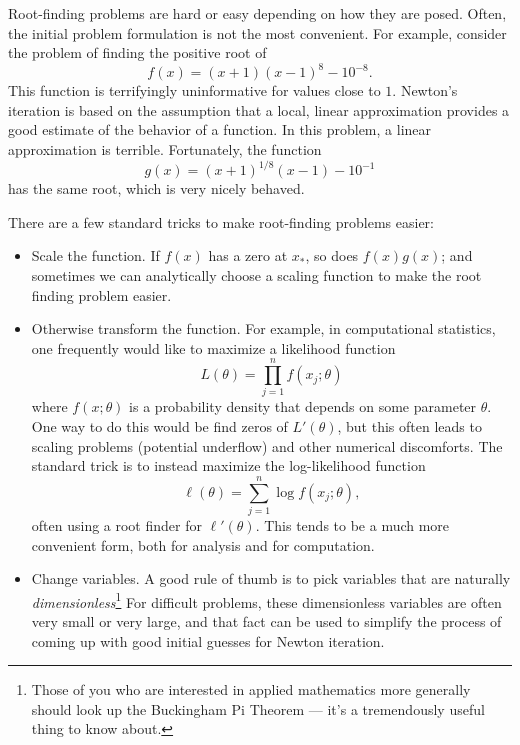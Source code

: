 \documentclass[12pt, leqno]{article} %
\begin{document}



Root-finding problems are hard or easy depending on how they are
posed.  Often, the initial problem formulation is not the most
convenient.  For example, consider the problem of finding the
positive root of
\[
  f(x) = (x+1)(x-1)^8-10^{-8}.
\]
This function is terrifyingly uninformative for values close to $1$.
Newton's iteration is based on the assumption that a local, linear
approximation provides a good estimate of the behavior of a function.
In this problem, a linear approximation is terrible.  Fortunately,
the function
\[
  g(x) = (x+1)^{1/8} (x-1)-10^{-1}
\]
has the same root, which is very nicely behaved.

There are a few standard tricks to make root-finding problems easier:
\begin{itemize}
\item
  Scale the function.  If $f(x)$ has a zero at $x_*$, so does $f(x)
  g(x)$; and sometimes we can analytically choose a scaling function
  to make the root finding problem easier.
\item
  Otherwise transform the function.  For example, in computational
  statistics, one frequently would like to maximize a likelihood function
  \[
    L(\theta) = \prod_{j=1}^n f(x_j; \theta)
  \]
  where $f(x; \theta)$ is a probability density that depends on some
  parameter $\theta$.  One way to do this would be find zeros of
  $L'(\theta)$, but this often leads to scaling problems (potential
  underflow) and other numerical discomforts.  The standard trick is
  to instead maximize the log-likelihood function
  \[
    \ell(\theta) = \sum_{j=1}^n \log f(x_j; \theta),
  \]
  often using a root finder for $\ell'(\theta)$.  This tends to be a
  much more convenient form, both for analysis and for computation.
\item
  Change variables.  A good rule of thumb is to pick variables that
  are naturally {\em dimensionless}\footnote{%
Those of you who are interested in applied mathematics more generally
should look up the Buckingham Pi Theorem --- it's a tremendously
useful thing to know about.
}
  For difficult problems, these dimensionless variables are often very
  small or very large, and that fact can be used to simplify the
  process of coming up with good initial guesses for Newton iteration.
\end{itemize}
\end{document}
